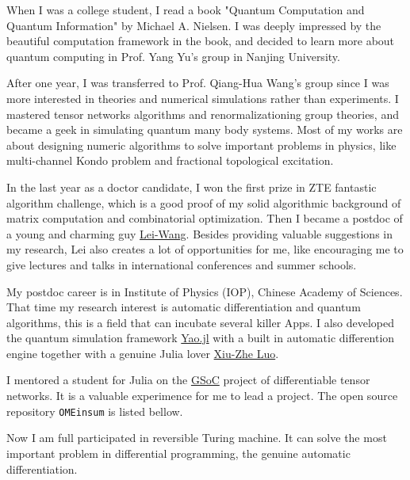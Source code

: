 \documentclass[letterpaper]{article}
\renewenvironment{itemize}{
  \begin{list}{}{
    \setlength{\leftmargin}{1.5em}
  }
}{
  \end{list}
}
\begin{document}
\begin{itemize}
    \item [1] When I was a college student, I read a book "Quantum Computation and Quantum Information" by Michael A. Nielsen.
        I was deeply impressed by the beautiful computation framework in the book, and decided to learn more about quantum computing in Prof. Yang Yu's group in Nanjing University.
    \item [2] After one year, I was transferred to Prof. Qiang-Hua Wang's group since I was more interested in theories and numerical simulations rather than experiments. I mastered tensor networks algorithms and renormalizationing group theories, and became a geek in simulating quantum many body systems. Most of my works are about designing numeric algorithms to solve important problems in physics, like multi-channel Kondo problem and fractional topological excitation.
    \item [3] In the last year as a doctor candidate, I won the first prize in ZTE fantastic algorithm challenge, which is a good proof of my solid algorithmic background of matrix computation and combinatorial optimization. Then I became a postdoc of a young and charming guy \href{http://wangleiphy.github.io/}{Lei-Wang}. Besides providing valuable suggestions in my research, Lei also creates a lot of opportunities for me, like encouraging me to give lectures and talks in international conferences and summer schools.
    \item [4] My postdoc career is in Institute of Physics (IOP), Chinese Academy of Sciences. That time my research interest is automatic differentiation and quantum algorithms, this is a field that can incubate several killer Apps. I also developed the quantum simulation framework \href{https://github.com/QuantumBFS/Yao.jl}{Yao.jl} with a built in automatic differention engine together with a genuine Julia lover \href{http://blog.rogerluo.me/}{Xiu-Zhe Luo}.
    \item [5] I mentored a student for Julia on the \href{https://summerofcode.withgoogle.com/}{GSoC} project of differentiable tensor networks. It is a valuable experimence for me to lead a project. The open source repository \texttt{OMEinsum} is listed bellow.
    \item [6] Now I am full participated in reversible Turing machine. It can solve the most important problem in differential programming, the genuine automatic differentiation.
\end{itemize}
\end{document}
